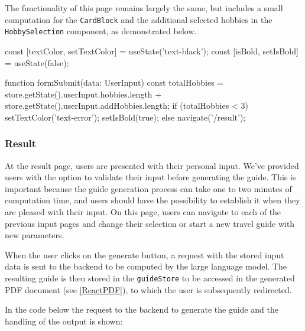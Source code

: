 \documentclass[english,notitlepage,smartquotes]{hgbreport}
\begin{document}
The functionality of this page remains largely the same, but includes a small computation for the \texttt{CardBlock} and the additional selected hobbies in the \texttt{HobbySelection} component, as demonstrated below.

\begin{JsCode}
	const [textColor, setTextColor] = useState('text-black'); 
	const [isBold, setIsBold] = useState(false);
	
	function formSubmit(data: UserInput) {
		const totalHobbies = store.getState().userInput.hobbies.length + 
			store.getState().userInput.addHobbies.length;
		if (totalHobbies < 3) {
			setTextColor('text-error');
			setIsBold(true);
		} else {
			navigate('/result');
		}
	}	
\end{JsCode}

\subsubsection{Result}


At the result page, users are presented with their personal input. We've provided users with the option to validate their input before generating the guide. This is important because the guide generation process can take one to two minutes of computation time, and users should have the possibility to establish it when they are pleased with their input. On this page, users can navigate to each of the previous input pages and change their selection or start a new travel guide with new parameters.

When the user clicks on the generate button, a request with the stored input data is sent to the backend to be computed by the large language model. The resulting guide is then stored in the \texttt{guideStore} to be accessed in the generated PDF document (see \ref{ReactPDF}), to which the user is subsequently redirected.

In the code below the request to the backend to generate the guide and the handling of the output is shown:
\end{document}
